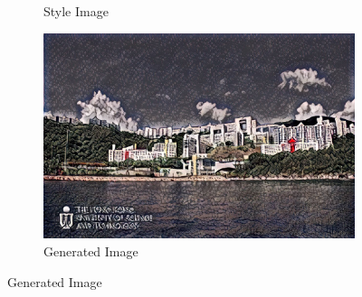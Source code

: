 \documentclass{article}
\begin{document}
\begin{figure}[ht]
\begin{minipage}{\textwidth}
\begin{subfigure}{0.25\textwidth}
            \caption{Style Image}
        \end{subfigure}
        \hfill %
        \begin{subfigure}{0.25\textwidth}
            \includegraphics[width=\textwidth]{./part1_inference/output_6_boris-kustodiev_under-honey-s-harmonica-1927.jpg}
            \caption{Generated Image}
        \end{subfigure}
    \end{minipage}
    
    \vspace{0.1cm}


\end{figure}
\end{document}
